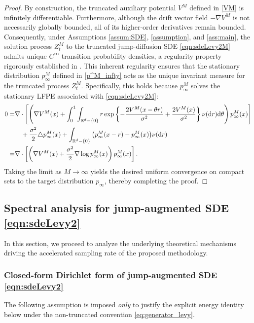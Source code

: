 \begin{proof}
    By construction, the truncated auxiliary potential $V^M$ defined in \eqref{VM} is infinitely differentiable. Furthermore, although the drift vector field $-\nabla V^M$ is not necessarily globally bounded, all of its higher-order derivatives remain bounded. Consequently, under Assumptions \ref{assum:SDE}, \ref{assumption}, and \ref{ass:main}, the solution process $Z^M_t$ to the truncated jump-diffusion SDE \eqref{eqn:sdeLevy2M} admits unique $C^\infty$ transition probability densities, a regularity property rigorously established in \cite[Theorem 3.4]{bally2024upper}. This inherent regularity ensures that the stationary distribution $p^M_\infty$ defined in \eqref{p^M_infty} acts as the unique invariant measure for the truncated process $Z^M_t$. Specifically, this holds because $p^M_\infty$ solves the stationary LFPE associated with \eqref{eqn:sdeLevy2M}:
    \begin{equation}
        \begin{aligned}
            0 =& \nabla\cdot\left[\left(\nabla V^M(x) + \int_0^1\int_{\mathbb{R}^d-\{0\}}r\exp\left\{-\frac{2V^M(x- \theta r)}{\sigma^2} + \frac{2V^M(x)}{\sigma^2}\right\} \nu(\mathrm{d} r)\mathrm{d}\theta \right)p^M_\infty(x)\right]  \\
            &\quad + \frac{\sigma^2}{2} \triangle p^M_\infty(x) + \int_{\mathbb{R}^d-\{0\}}\big(p^M_\infty(x-r) -p^M_\infty(x)\big)\nu(\mathrm{d} r)\\
            =&\nabla\cdot \left[\left(\nabla V^M(x)    + \frac{\sigma^2}{2} \nabla\log p^M_\infty(x)\right)p^M_\infty(x)\right].
        \end{aligned}
    \end{equation}
    Taking the limit as $M\to\infty$ yields the desired uniform convergence on compact sets to the target distribution $p_\infty$, thereby completing the proof.
\end{proof}



\subsection{Spectral analysis for jump-augmented SDE \eqref{eqn:sdeLevy2}}
In this section, we proceed to analyze the underlying theoretical mechanisms driving the accelerated sampling rate of the proposed methodology.
\subsubsection{Closed-form Dirichlet form of jump-augmented SDE \eqref{eqn:sdeLevy2}}
The following assumption is imposed \emph{only} to justify the explicit energy identity below under the non-truncated convention \eqref{eq:generator_levy}.

